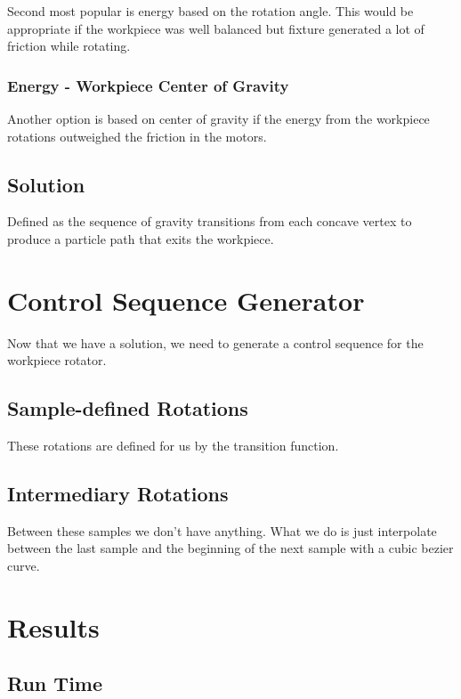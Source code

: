 Second most popular is energy based on the rotation angle. This would be appropriate if the workpiece was well balanced but fixture generated a lot of friction while rotating.

		\subsubsection{Energy - Workpiece Center of Gravity}

Another option is based on center of gravity if the energy from the workpiece rotations outweighed the friction in the motors.

	\subsection{Solution}

		Defined as the sequence of gravity transitions from each concave vertex to produce a particle path that exits the workpiece.

\section{Control Sequence Generator}

Now that we have a solution, we need to generate a control sequence for the workpiece rotator.

	\subsection{Sample-defined Rotations}

These rotations are defined for us by the transition function.

	\subsection{Intermediary Rotations}

Between these samples we don't have anything. What we do is just interpolate between the last sample and the beginning of the next sample with a cubic bezier curve.

\section{Results}

	\subsection{Run Time}

